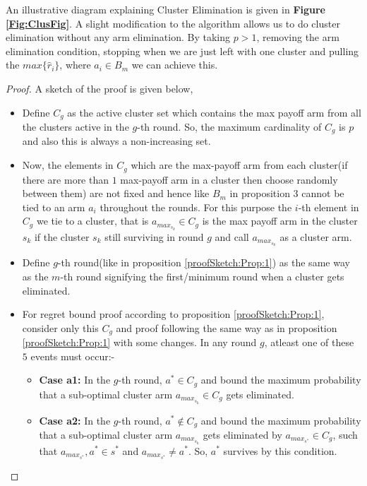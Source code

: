 An illustrative diagram explaining Cluster Elimination is given in \textbf{Figure \ref{Fig:ClusFig}}. A slight modification to the algorithm allows us to do cluster elimination without any arm elimination. By taking $p>1$, removing the arm elimination condition, stopping when we are just left with one cluster and pulling the $max\lbrace \hat{r}_{i}\rbrace$, where $a_{i}\in B_{m}$ we can achieve this.
 

\begin{proof}
 A sketch of the proof is given below,

\begin{itemize}
\item Define $C_{g}$ as the active cluster set which contains the max payoff arm from all the clusters active in the $g$-th round. So, the maximum cardinality of $C_{g}$ is $p$ and also this is always a non-increasing set.
\item Now, the elements in $C_{g}$ which are the max-payoff arm from each cluster(if there are more than $1$ max-payoff arm in a cluster then choose randomly between them) are not fixed and hence like $B_{m}$ in proposition $3$ cannot be tied to an arm $a_{i}$ throughout the rounds. For this purpose the $i$-th element in $C_{g}$ we tie to a cluster, that is $a_{max_{s_{k}}}\in C_{g}$ is the max payoff arm in the cluster $s_{k}$ if the cluster $s_{k}$ still surviving in round $g$ and call $a_{max_{s_{k}}}$ as a cluster arm. 
\item Define $g$-th round(like in proposition \ref{proofSketch:Prop:1}) as the same way as the $m$-th round signifying the first/minimum round when a cluster gets eliminated.
\item For regret bound proof according to proposition \ref{proofSketch:Prop:1}, consider only this $C_{g}$ and proof following the same way as in proposition \ref{proofSketch:Prop:1} with some changes. In any round $g$, atleast one of these $5$ events must occur:-
\begin{itemize}
\item \textbf{Case a1:} In the $g$-th round, $a^{*}\in C_{g}$ and bound the maximum probability that a sub-optimal cluster arm $a_{max_{s_{k}}}\in C_{g}$ gets eliminated.
\item \textbf{Case a2:} In the $g$-th round, $a^{*}\notin C_{g}$ and bound the maximum probability that a sub-optimal cluster arm $a_{max_{s_{k}}}$ gets eliminated by $a_{max_{s^{*}}}\in C_{g}$, such that $a_{max_{s^{*}}},a^{*}\in s^{*}$ and $a_{max_{s^{*}}}\neq a^{*}$. So, $a^{*}$ survives by this condition.

\end{itemize}
\end{itemize}
\end{proof}
